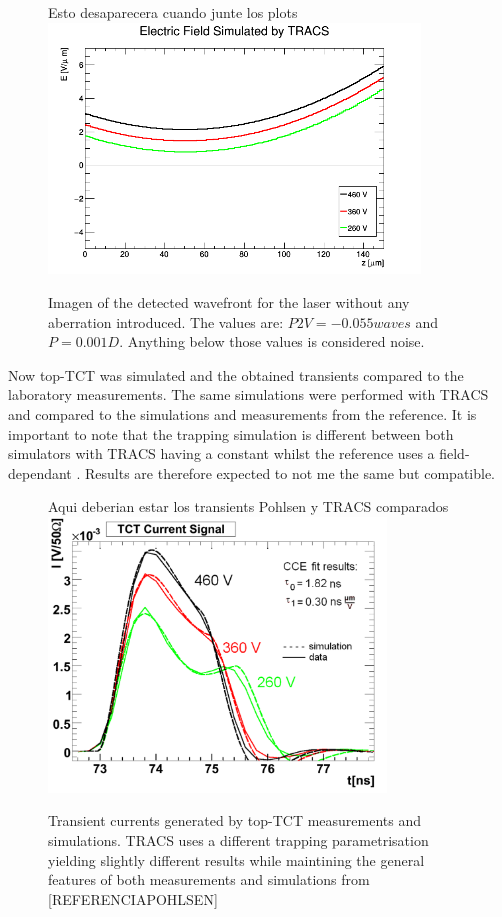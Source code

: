 \begin{figure}[H]
	\centering
	Esto desaparecera cuando junte los plots
	\includegraphics[width=0.88\textwidth]{TRACSpohlsFields.png}
	\label{fig:mues2}
	\caption{Imagen of the detected wavefront for the laser without any aberration introduced. The values are: $P2V = -0.055waves$ and $P = 0.001D$. Anything below those values is considered noise.}%
\end{figure}

Now top-TCT was simulated and the obtained transients compared to the laboratory measurements. The same simulations were performed with TRACS and compared to the simulations and measurements from the reference. It is important to note that the trapping simulation is different between both simulators with TRACS having a constant \tau whilst the reference uses a field-dependant \tau. Results are therefore expected to not me the same but compatible.

\begin{figure}[H]
	\centering
	Aqui deberian estar los transients Pohlsen y TRACS comparados
	\includegraphics[width=0.8\textwidth]{Pohlsen_scr.png}
	\label{fig:mues2}
	\caption{Transient currents generated by top-TCT measurements and simulations. TRACS uses a different trapping parametrisation yielding slightly different results while maintining the general features of both measurements and simulations from [REFERENCIAPOHLSEN]}
\end{figure}

